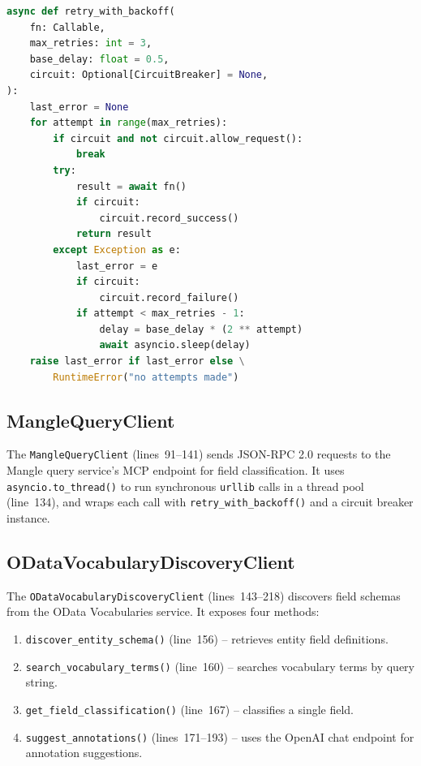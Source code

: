 \documentclass[11pt]{article}
\begin{document}
\begin{lstlisting}[language=Python,caption={Exponential backoff (data\_cleaning\_agent.py:63--88)}]
async def retry_with_backoff(
    fn: Callable,
    max_retries: int = 3,
    base_delay: float = 0.5,
    circuit: Optional[CircuitBreaker] = None,
):
    last_error = None
    for attempt in range(max_retries):
        if circuit and not circuit.allow_request():
            break
        try:
            result = await fn()
            if circuit:
                circuit.record_success()
            return result
        except Exception as e:
            last_error = e
            if circuit:
                circuit.record_failure()
            if attempt < max_retries - 1:
                delay = base_delay * (2 ** attempt)
                await asyncio.sleep(delay)
    raise last_error if last_error else \
        RuntimeError("no attempts made")
\end{lstlisting}

\subsection{MangleQueryClient}

The \texttt{MangleQueryClient} (lines~91--141) sends JSON-RPC 2.0 requests to
the Mangle query service's MCP endpoint for field classification. It uses
\texttt{asyncio.to\_thread()} to run synchronous \texttt{urllib} calls in a
thread pool (line~134), and wraps each call with \texttt{retry\_with\_backoff()}
and a circuit breaker instance.

\subsection{ODataVocabularyDiscoveryClient}

The \texttt{ODataVocabularyDiscoveryClient} (lines~143--218) discovers field
schemas from the OData Vocabularies service. It exposes four methods:

\begin{enumerate}
  \item \texttt{discover\_entity\_schema()} (line~156) -- retrieves entity field
    definitions.
  \item \texttt{search\_vocabulary\_terms()} (line~160) -- searches vocabulary
    terms by query string.
  \item \texttt{get\_field\_classification()} (line~167) -- classifies a single
    field.
  \item \texttt{suggest\_annotations()} (lines~171--193) -- uses the OpenAI
    chat endpoint for annotation suggestions.
\end{enumerate}
\end{document}
